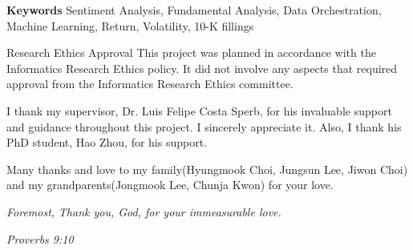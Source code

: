 \documentclass[logo,bsc,singlespacing,parskip]{infthesis}
\begin{document}
\begin{preliminary}
{\textbf{Keywords}
Sentiment Analysis, Fundamental Analysis, Data Orchestration, Machine Learning, Return, Volatility, 10-K fillings
}




\maketitle

\newenvironment{ethics}
   {\begin{frontenv}{Research Ethics Approval}{\LARGE}}
   {\end{frontenv}\newpage}

\begin{ethics}
This project was planned in accordance with the Informatics Research
Ethics policy. It did not involve any aspects that required approval
from the Informatics Research Ethics committee.

\standarddeclaration
\end{ethics}


\begin{acknowledgements}
I thank my supervisor, Dr. Luis Felipe Costa Sperb, for his invaluable support and guidance throughout this project. I sincerely appreciate it. Also, I thank his PhD student, Hao Zhou, for his support.

Many thanks and love to my family(Hyungmook Choi, Jungsun Lee, Jiwon Choi) and my grandparents(Jongmook Lee, Chunja Kwon) for your love.

\vspace{33pt}

\textit{Foremost,} 
\textit{Thank you, God, for your immeasurable love.}
\begin{flushright}
\textit{\small Proverbs 9:10}
\end{flushright}

\end{acknowledgements}



\tableofcontents
\end{preliminary}
\end{document}
